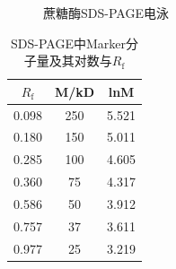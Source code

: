 \begin{figure}
    \caption{蔗糖酶SDS-PAGE电泳}
    \label{fig:SDS-PAGE}
\end{figure}
\begin{table}[H]
\centering
\caption{SDS-PAGE中Marker分子量及其对数与$R_\text{f}$}
\label{tab:SDS-PAGE_marker}
\begin{tabular}{@{}ccc@{}}
\toprule
$R_\text{f}$    & M/kD & lnM   \\ \midrule
0.098 & 250  & 5.521 \\
0.180 & 150  & 5.011 \\
0.285 & 100  & 4.605 \\
0.360 & 75   & 4.317 \\
0.586 & 50   & 3.912 \\
0.757 & 37   & 3.611 \\
0.977 & 25   & 3.219 \\ \bottomrule
\end{tabular}
\end{table}
